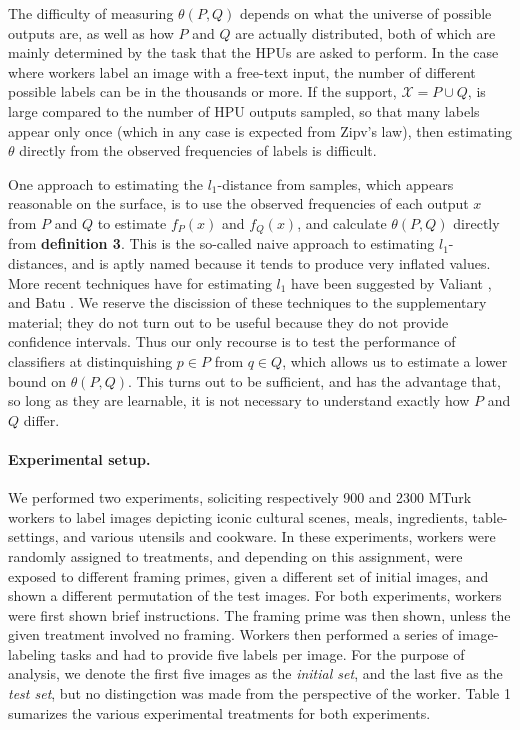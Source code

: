 \documentclass[12pt]{article}
\begin{document}
The difficulty of measuring $\theta(P,Q)$ depends on what the universe of
possible outputs are, as well as how $P$ and $Q$ are actually distributed,
both of which are mainly determined by the task that the HPUs are asked to 
perform.  In the case where workers label an image with a free-text input, 
the number of different possible labels can be in the thousands or more.  If
the support, $\mathcal{X} = P \cup Q$, is large compared to the number of 
HPU outputs sampled, so that many labels appear only once (which in any case
is expected from Zipv's law), then estimating $\theta$ directly from the
observed frequencies of labels is difficult.  

One approach to estimating the $l_1$-distance from samples, which appears
reasonable on the surface, is to use the observed frequencies of each output
$x$ from $P$ and $Q$ to estimate $f_P(x)$ and $f_Q(x)$, and calculate 
$\theta(P,Q)$ directly from \textbf{definition 3}.  This is the so-called naive
approach to estimating $l_1$-distances, and is aptly named because it tends
to produce very inflated values.  More recent techniques have for estimating
$l_1$ have been suggested by Valiant \cite{val-thesis}, and Batu 
\cite{batu2000testing,batu2013testing}.  We reserve the discission of these
techniques to the supplementary material; they do not turn out to be useful
because they do not provide confidence intervals.  Thus our only recourse is
to test the performance of classifiers at distinquishing $p \in P$ from 
$q \in Q$, which allows us to estimate a lower bound on $\theta(P,Q)$.  This 
turns out to be sufficient, and has the advantage that, so long as they are
learnable, it is not necessary to understand exactly how $P$ and $Q$ differ.


\paragraph{Experimental setup.}
We performed two experiments, soliciting respectively 900 and 2300 MTurk 
workers to label images depicting iconic cultural scenes, meals, ingredients, 
table-settings, and various utensils and cookware. In these experiments,
workers were randomly assigned to treatments, and depending on this 
assignment, were exposed to different framing primes, given a different 
set of initial images, and shown a different permutation of the test images. 
For both experiments, workers were first shown brief instructions.  
The framing prime was then shown, unless the given 
treatment involved no framing.  Workers then performed a series of 
image-labeling tasks and had to provide five labels per image. 
For the purpose of analysis, we denote the first five images as the 
\textit{initial set}, and the last five as the \textit{test set}, but no
distingction was made from
the perspective of the worker.
Table 1 sumarizes the various experimental treatments for both 
experiments.
\end{document}
